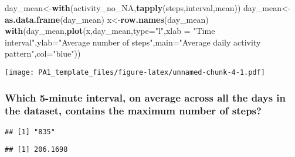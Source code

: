 \documentclass[]{article}
\newenvironment{Shaded}{\begin{snugshade}}{\end{snugshade}}
\newcommand{\KeywordTok}[1]{\textcolor[rgb]{0.13,0.29,0.53}{\textbf{#1}}}
\newcommand{\DataTypeTok}[1]{\textcolor[rgb]{0.13,0.29,0.53}{#1}}
\newcommand{\StringTok}[1]{\textcolor[rgb]{0.31,0.60,0.02}{#1}}
\newcommand{\OperatorTok}[1]{\textcolor[rgb]{0.81,0.36,0.00}{\textbf{#1}}}
\newcommand{\NormalTok}[1]{#1}
\begin{document}
\begin{Shaded}
\begin{Highlighting}[]
\NormalTok{day_mean<-}\KeywordTok{with}\NormalTok{(activity_no_NA,}\KeywordTok{tapply}\NormalTok{(steps,interval,mean))}
\NormalTok{day_mean<-}\KeywordTok{as.data.frame}\NormalTok{(day_mean)}
\NormalTok{x<-}\KeywordTok{row.names}\NormalTok{(day_mean)}
\KeywordTok{with}\NormalTok{(day_mean,}\KeywordTok{plot}\NormalTok{(x,day_mean,}\DataTypeTok{type=}\StringTok{"l"}\NormalTok{,}\DataTypeTok{xlab =} \StringTok{"Time interval"}\NormalTok{,}\DataTypeTok{ylab=}\StringTok{"Average number of steps"}\NormalTok{,}\DataTypeTok{main=}\StringTok{"Average daily activity pattern"}\NormalTok{,}\DataTypeTok{col=}\StringTok{"blue"}\NormalTok{))}
\end{Highlighting}
\end{Shaded}

\texttt{[image: PA1\_template\_files/figure-latex/unnamed-chunk-4-1.pdf]}

\subsubsection{Which 5-minute interval, on average across all the days
in the dataset, contains the maximum number of
steps?}\label{which-5-minute-interval-on-average-across-all-the-days-in-the-dataset-contains-the-maximum-number-of-steps}

\begin{Shaded}
\end{Shaded}

\begin{verbatim}
## [1] "835"
\end{verbatim}

\begin{Shaded}
\end{Shaded}

\begin{verbatim}
## [1] 206.1698
\end{verbatim}
\end{document}

